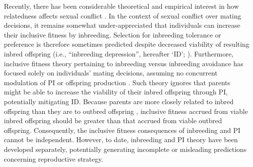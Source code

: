 \documentclass[12pt]{article}
\begin{document}
Recently, there has been considerable theoretical and empirical interest in how relatedness affects sexual conflict \cite[e.g., ][]{Pizzari2012, Carazo2014, Chippindale2015, Faria2015, Martin2015}. In the context of sexual conflict over mating decisions, it remains somewhat under-appreciated that individuals can increase their inclusive fitness by inbreeding. Selection for inbreeding tolerance or preference is therefore sometimes predicted despite decreased viability of resulting inbred offspring (i.e., ``inbreeding depression'', hereafter `ID'; \cite[][]{Parker1979, Parker2006}). Furthermore, inclusive fitness theory pertaining to inbreeding versus inbreeding avoidance has focused solely on individuals' mating decisions, assuming no concurrent modulation of PI or offspring production \cite[][]{Parker2006, Kokko2006, Duthie2015a}. Such theory ignores that parents might be able to increase the viability of their inbred offspring through PI, potentially mitigating ID. Because parents are more closely related to inbred offspring than they are to outbred offspring \cite[][]{Trivers1974, Lynch1998, Reid2016}, inclusive fitness accrued from viable inbred offspring should be greater than that accrued from viable outbred offspring. Consequently, the inclusive fitness consequences of inbreeding and PI cannot be independent. However, to date, inbreeding and PI theory have been developed separately, potentially generating incomplete or misleading predictions concerning reproductive strategy.
\end{document}
